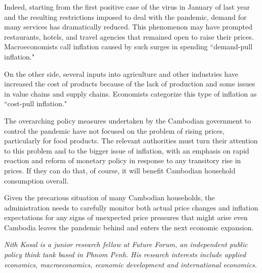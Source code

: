 \documentclass[10pt,a4paper]{letter}
\begin{document}
Indeed, starting from the first positive case of the virus in January of last year and the resulting restrictions imposed to deal with the pandemic, demand for many services has dramatically reduced. This phenomenon may have prompted restaurants, hotels, and travel agencies that remained open to raise their prices. Macroeconomists call inflation caused by such surges in spending ``demand-pull inflation."

On the other side, several inputs into agriculture and other industries have increased the cost of products because of the lack of production and some issues in value chains and supply chains. Economists categorize this type of inflation as ``cost-pull inflation."

The overarching policy measures undertaken by the Cambodian government to control the pandemic have not focused on the problem of rising prices, particularly for food products. The relevant authorities must turn their attention to this problem and to the bigger issue of inflation, with an emphasis on rapid reaction and reform of monetary policy in response to any transitory rise in prices. If they can do that, of course, it will benefit Cambodian household consumption overall.

Given the precarious situation of many Cambodian households, the administration needs to carefully monitor both actual price changes and inflation expectations for any signs of unexpected price pressures that might arise even Cambodia leaves the pandemic behind and enters the next economic expansion.

\textit{Nith Kosal is a junior research fellow at Future Forum, an independent public policy think tank based in Phnom Penh. His research interests include applied economics, macroeconomics, economic development and international economics.}
\end{document}
